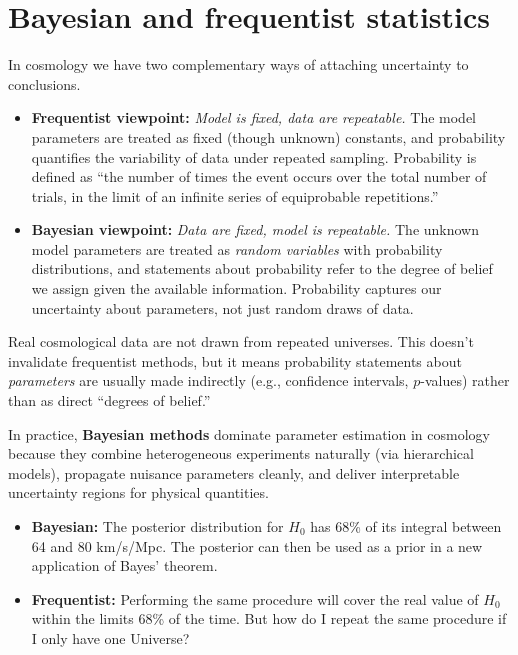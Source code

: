 \section{Bayesian and frequentist statistics}

In cosmology we have two complementary ways of attaching uncertainty to conclusions.

\begin{itemize}
    \item \textbf{Frequentist viewpoint:} \textit{Model is fixed, data are repeatable.} The model parameters are treated as fixed (though unknown) constants, and probability quantifies the variability of data under repeated sampling. Probability is defined as ``the number of times the event occurs over the total number of trials, in the limit of an infinite series of equiprobable repetitions.''

    \item \textbf{Bayesian viewpoint:} \textit{Data are fixed, model is repeatable.} The unknown model parameters are treated as \textit{random variables} with probability distributions, and statements about probability refer to the degree of belief we assign given the available information. Probability captures our uncertainty about parameters, not just random draws of data.
\end{itemize}

\begin{observationblock}[Repeatability]
        Real cosmological data are not drawn from repeated universes. This doesn't invalidate frequentist methods, but it means probability statements about \emph{parameters} are usually made indirectly (e.g., confidence intervals, $p$-values) rather than as direct ``degrees of belief.''
   
\end{observationblock}

In practice, \textbf{Bayesian methods} dominate parameter estimation in cosmology because they combine heterogeneous experiments naturally (via hierarchical models), propagate nuisance parameters cleanly, and deliver interpretable uncertainty regions for physical quantities.

\begin{exampleblock}[$H_0 = (72 \pm 8)$~km\,s$^{-1}$\,Mpc$^{-1}$]
    \begin{itemize}
        \item \textcolor{red!80!black}{\textbf{Bayesian:}} The posterior distribution for $H_0$ has 68\% of its integral between 64 and 80 km/s/Mpc. The posterior can then be used as a prior in a new application of Bayes' theorem.
        \item \textcolor{blue!80!black}{\textbf{Frequentist:}} Performing the same procedure will cover the real value of $H_0$ within the limits 68\% of the time. But how do I repeat the same procedure if I only have one Universe?
    \end{itemize}
\end{exampleblock}

